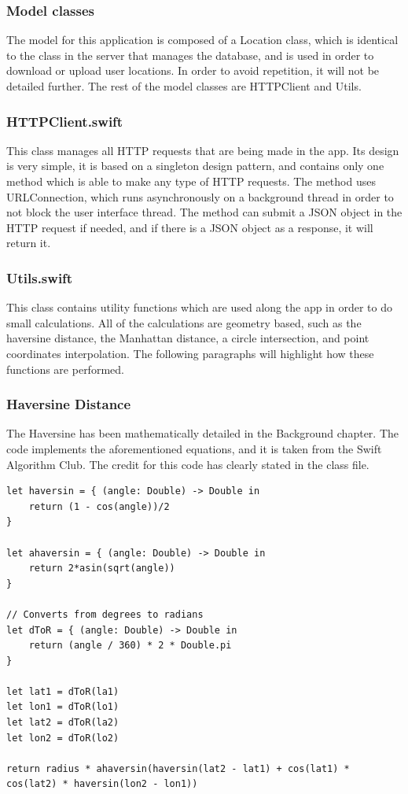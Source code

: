\subsubsection{Model classes}
The model for this application is composed of a Location class, which is identical to the class in the server that manages the database, and is used in order to download or upload user locations. In order to avoid repetition, it will not be detailed further. The rest of the model classes are HTTPClient and Utils.

\subsubsection*{HTTPClient.swift}
This class manages all HTTP requests that are being made in the app. Its design is very simple, it is based on a singleton design pattern, and contains only one method which is able to make any type of HTTP requests. The method uses URLConnection, which runs asynchronously on a background thread in order to not block the user interface thread. The method can submit a JSON object in the HTTP request if needed, and if there is a JSON object as a response, it will return it.

\subsubsection*{Utils.swift}
This class contains utility functions which are used along the app in order to do small calculations. All of the calculations are geometry based, such as the haversine distance, the Manhattan distance, a circle intersection, and point coordinates interpolation. The following paragraphs will highlight how these functions are performed.

\subsubsection*{Haversine Distance}
The Haversine has been mathematically detailed in the Background chapter. The code implements the aforementioned equations, and it is taken from the Swift Algorithm Club. The credit for this code has clearly stated in the class file.

\begin{lstlisting}
let haversin = { (angle: Double) -> Double in
	return (1 - cos(angle))/2
}
		
let ahaversin = { (angle: Double) -> Double in
    return 2*asin(sqrt(angle))
}
		
// Converts from degrees to radians
let dToR = { (angle: Double) -> Double in
    return (angle / 360) * 2 * Double.pi
}
		
let lat1 = dToR(la1)
let lon1 = dToR(lo1)
let lat2 = dToR(la2)
let lon2 = dToR(lo2)
		
return radius * ahaversin(haversin(lat2 - lat1) + cos(lat1) * cos(lat2) * haversin(lon2 - lon1))
\end{lstlisting}

